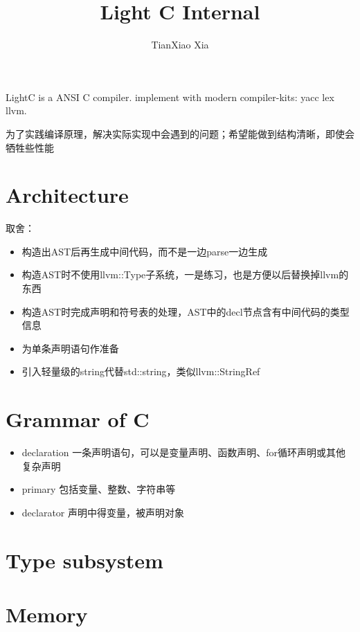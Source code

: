 \documentclass[11pt]{article} %
\title{Light C Internal}
\author{ TianXiao Xia}
\date{} %
\begin{document}
\maketitle
LightC is a ANSI C compiler.  implement with modern compiler-kits: yacc lex llvm. 

为了实践编译原理，解决实际实现中会遇到的问题；希望能做到结构清晰，即使会牺牲些性能

\section{Architecture}


取舍：
\begin{itemize}
\item 构造出AST后再生成中间代码，而不是一边parse一边生成
\item 构造AST时不使用llvm::Type子系统，一是练习，也是方便以后替换掉llvm的东西
\item 构造AST时完成声明和符号表的处理，AST中的decl节点含有中间代码的类型信息
\end{itemize}

\begin{itemize}
\item 为单条声明语句作准备
\end{itemize}

\begin{itemize}
\item 引入轻量级的string代替std::string，类似llvm::StringRef

\end{itemize}
\section{Grammar of C}
\begin{itemize}
\item declaration 一条声明语句，可以是变量声明、函数声明、for循环声明或其他复杂声明
\item primary 包括变量、整数、字符串等
\item declarator 声明中得变量，被声明对象
\end{itemize}
\section{Type subsystem}
\section{Memory}
\end{document}
